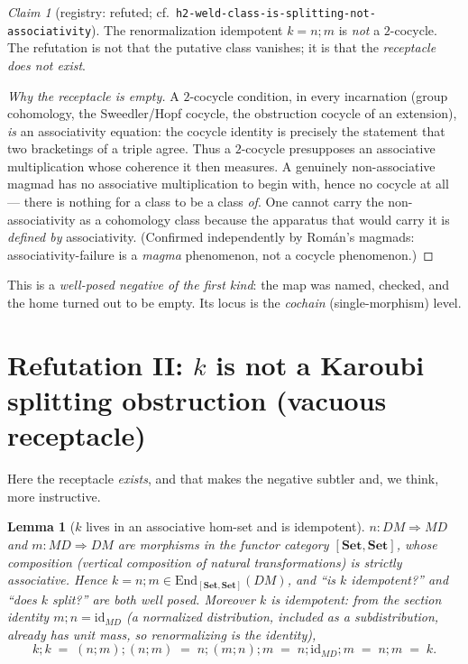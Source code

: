 \documentclass[11pt]{amsart}
\theoremstyle{plain}
\newtheorem{lemma}[theorem]{Lemma}
\theoremstyle{definition}
\theoremstyle{remark}
\newtheorem{claim}[theorem]{Claim}
\newcommand{\Set}{\mathbf{Set}}
\newcommand{\End}{\mathrm{End}}
\newcommand{\id}{\mathrm{id}}
\newcommand{\comp}{\mathbin{;}}
\begin{document}
\begin{claim}[registry: refuted; cf.\ \texttt{h2-weld-class-is-splitting-not-associativity}]
\label{clm:cocycle}
The renormalization idempotent $k=n\comp m$ is \emph{not} a $2$-cocycle. The refutation is not that
the putative class vanishes; it is that the \emph{receptacle does not exist}.
\end{claim}

\begin{proof}[Why the receptacle is empty]
A $2$-cocycle condition, in every incarnation (group cohomology, the Sweedler/Hopf cocycle, the
obstruction cocycle of an extension), \emph{is} an associativity equation: the cocycle identity is
precisely the statement that two bracketings of a triple agree. Thus a $2$-cocycle presupposes an
associative multiplication whose coherence it then measures. A genuinely non-associative magmad has
no associative multiplication to begin with, hence no cocycle at all --- there is nothing for a class
to be a class \emph{of}. One cannot carry the non-associativity as a cohomology class because the
apparatus that would carry it is \emph{defined by} associativity. (Confirmed independently by
Rom\'an's magmads: associativity-failure is a \emph{magma} phenomenon, not a cocycle phenomenon.)
\end{proof}

This is a \emph{well-posed negative of the first kind}: the map was named, checked, and the home
turned out to be empty. Its locus is the \emph{cochain} (single-morphism) level.

\section{Refutation II: \texorpdfstring{$k$}{k} is not a Karoubi splitting obstruction (vacuous receptacle)}
\label{sec:karoubi}

Here the receptacle \emph{exists}, and that makes the negative subtler and, we think, more
instructive.

\begin{lemma}[$k$ lives in an associative hom-set and is idempotent]
\label{lem:k-idem}
$n\colon DM\Rightarrow MD$ and $m\colon MD\Rightarrow DM$ are morphisms in the functor category
$[\Set,\Set]$, whose composition (vertical composition of natural transformations) is strictly
associative. Hence $k=n\comp m\in\End_{[\Set,\Set]}(DM)$, and ``is $k$ idempotent?'' and ``does $k$
split?'' are both well posed. Moreover $k$ is idempotent: from the \emph{section identity}
$m\comp n=\id_{MD}$ (a normalized distribution, included as a subdistribution, already has unit mass,
so renormalizing is the identity),
\[
  k\comp k \;=\; (n\comp m)\comp(n\comp m)
           \;=\; n\comp(m\comp n)\comp m
           \;=\; n\comp \id_{MD}\comp m
           \;=\; n\comp m \;=\; k.
\]
\end{lemma}
\end{document}
